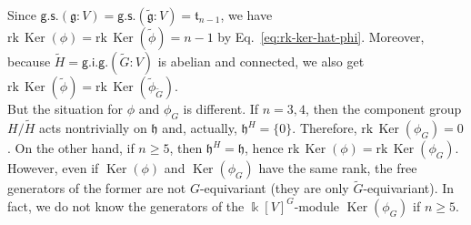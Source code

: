 \begin{ex}
\begin{rme}   \label{rmk:sravnenie-ker}
Since $\mathsf{g.s.}({{\mathfrak g}}:V)=\mathsf{g.s.}(\tilde{{\mathfrak g}}:V)={{\mathfrak t}}_{n-1}$, we have
${{\mathrm{rk\,}}}{\operatorname{Ker}}(\phi)={{\mathrm{rk\,}}}{\operatorname{Ker}}(\tilde\phi) =n-1$ by Eq.~\eqref{eq:rk-ker-hat-phi}.  
Moreover, because $\tilde H={\mathsf{g.i.g.}}(\tilde G:V)$ is abelian and connected, we also get
${{\mathrm{rk\,}}}{\operatorname{Ker}}(\tilde\phi)={{\mathrm{rk\,}}}{\operatorname{Ker}}(\tilde\phi_{\tilde G})$. 
\\ \indent But the situation for $\phi$ and $\phi_G$ is different.
If $n=3,4$, then the component group
$H/\tilde H$ acts nontrivially on ${{\mathfrak h}}$ and, actually, ${{\mathfrak h}}^H=\{0\}$. Therefore, ${{\mathrm{rk\,}}}{\operatorname{Ker}}(\phi_{G})=0$.
On the other hand, if $n{\geqslant} 5$, then ${{\mathfrak h}}^H={{\mathfrak h}}$, hence ${{\mathrm{rk\,}}}{\operatorname{Ker}}(\phi)={{\mathrm{rk\,}}}{\operatorname{Ker}}(\phi_{G})$. 
However, even if ${\operatorname{Ker}}(\phi)$ and ${\operatorname{Ker}}(\phi_{G})$ have the same rank, the free generators of the former are not $G$-equivariant (they are only $\tilde G$-equivariant). In fact, we do not know the generators of the ${\Bbbk}[V]^G$-module
${\operatorname{Ker}}(\phi_{G})$ if $n{\geqslant} 5$.
\end{rme}
\end{ex}

